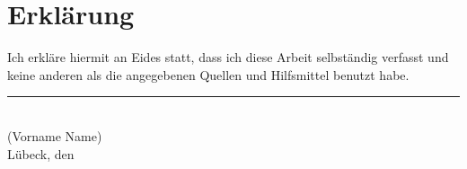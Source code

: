 
\cleardoublepage
\thispagestyle{plain}
\vspace*{\fill}

\section*{Erklärung}

Ich erkläre hiermit an Eides statt, dass ich diese Arbeit selbständig verfasst und keine
anderen als die angegebenen Quellen und Hilfsmittel benutzt habe.

\vskip2cm

\rule{5cm}{0.4pt}\\
(Vorname Name)\\
Lübeck, den \duedate